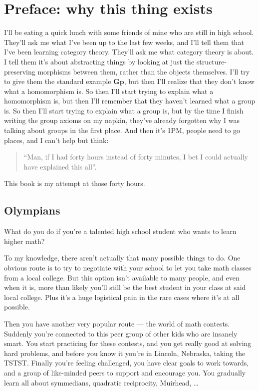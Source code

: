 \chapter*{Preface: why this thing exists}
I'll be eating a quick lunch with some friends of mine who are still in high school.
They'll ask me what I've been up to the last few weeks,
and I'll tell them that I've been learning category theory.
They'll ask me what category theory is about.
I tell them it's about abstracting things by looking at just the
structure-preserving morphisms between them, rather than the objects themselves.
I'll try to give them the standard example $\mathbf{Gp}$,
but then I'll realize that they don't know what a homomorphism is.
So then I'll start trying to explain what a homomorphism is,
but then I'll remember that they haven't learned what a group is.
So then I'll start trying to explain what a group is,
but by the time I finish writing the group axioms on my napkin,
they've already forgotten why I was talking about groups in the first place.
And then it's 1PM, people need to go places, and I can't help but think:
\begin{quote}
	``Man, if I had forty hours instead of forty minutes, I bet I could actually have explained this all''.
\end{quote}
This book is my attempt at those forty hours.

\section*{Olympians}
What do you do if you're a talented high school student
who wants to learn higher math?

To my knowledge, there aren't actually that many possible things to do.
One obvious route is to try to negotiate with your school to
let you take math classes from a local college.
But this option isn't available to many people,
and even when it is, more than likely you'll still be the
best student in your class at said local college.
Plus it's a huge logistical pain in the rare cases where it's at all possible.

Then you have another very popular route --- the world of math contests.
Suddenly you're connected to this peer group of other kids who are insanely smart.
You start practicing for these contests, and you get really good at solving hard problems,
and before you know it you're in Lincoln, Nebraska, taking the TSTST.
Finally you're feeling challenged, you have clear goals to work towards,
and a group of like-minded peers to support and encourage you.
You gradually learn all about symmedians, quadratic reciprocity, Muirhead, \dots

